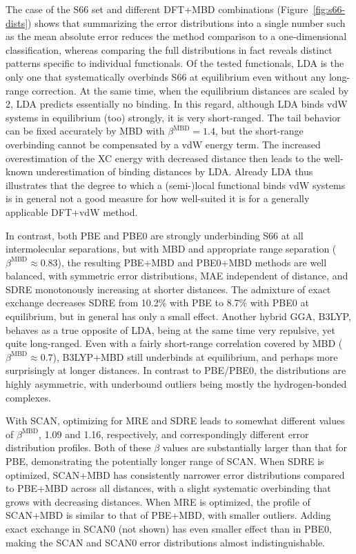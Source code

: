 The case of the S66 set and different DFT+MBD combinations (Figure~\ref{fig:s66-dists}) shows that summarizing the error distributions into a single number such as the mean absolute error reduces the method comparison to a one-dimensional classification, whereas comparing the full distributions in fact reveals distinct patterns specific to individual functionals.
Of the tested functionals, LDA is the only one that systematically overbinds S66 at equilibrium even without any long-range correction.
At the same time, when the equilibrium distances are scaled by 2, LDA predicts essentially no binding.
In this regard, although LDA binds vdW systems in equilibrium (too) strongly, it is very short-ranged.
The tail behavior can be fixed accurately by MBD with $\beta^\text{MBD}=1.4$, but the short-range overbinding cannot be compensated by a vdW energy term.
The increased overestimation of the XC energy with decreased distance then leads to the well-known underestimation of binding distances by LDA\@.
Already LDA thus illustrates that the degree to which a (semi-)local functional binds vdW systems is in general not a good measure for how well-suited it is for a generally applicable DFT+vdW method. %

In contrast, both PBE and PBE0 are strongly underbinding S66 at all intermolecular separations, but with MBD and appropriate range separation ($\beta^\text{MBD}\approx0.83$), the resulting PBE+MBD and PBE0+MBD methods are well balanced, with symmetric error distributions, MAE independent of distance, and SDRE monotonously increasing at shorter distances.
The admixture of exact exchange decreases SDRE from 10.2\% with PBE to 8.7\% with PBE0 at equilibrium, but in general has only a small effect.
Another hybrid GGA, B3LYP, behaves as a true opposite of LDA, being at the same time very repulsive, yet quite long-ranged.
Even with a fairly short-range correlation covered by MBD ($\beta^\text{MBD}\approx0.7$), B3LYP+MBD still underbinds at equilibrium, and perhaps more surprisingly at longer distances.
In contrast to PBE/PBE0, the distributions are highly asymmetric, with underbound outliers being mostly the hydrogen-bonded complexes.

With SCAN, optimizing for MRE and SDRE leads to somewhat different values of $\beta^\text{MBD}$, 1.09 and 1.16, respectively, and correspondingly different error distribution profiles.
Both of these $\beta$ values are substantially larger than that for PBE, demonstrating the potentially longer range of SCAN\@.
When SDRE is optimized, SCAN+MBD has consistently narrower error distributions compared to PBE+MBD across all distances, with a slight systematic overbinding that grows with decreasing distances.
When MRE is optimized, the profile of SCAN+MBD is similar to that of PBE+MBD, with smaller outliers.
Adding exact exchange in SCAN0 (not shown) has even smaller effect than in PBE0, making the SCAN and SCAN0 error distributions almost indistinguishable.

